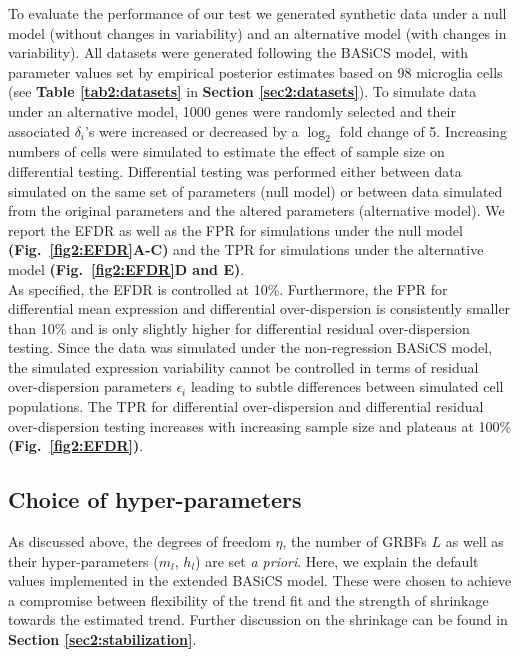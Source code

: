\newpage

To evaluate the performance of our test we generated synthetic data under a null model (without changes in variability) and an alternative model (with changes in variability). 
All datasets were generated following the BASiCS model, with parameter values set by empirical posterior estimates based on 98 microglia cells \citep{Zeisel2015} (see \textbf{Table \ref{tab2:datasets}} in \textbf{Section \ref{sec2:datasets}}). 
To simulate data under an alternative model, 1000 genes were randomly selected and their associated $\delta_i$'s were increased or decreased by a $\log_2$ fold change of 5. 
Increasing numbers of cells were simulated to estimate the effect of sample size on differential testing. 
Differential testing was performed either between data simulated on the same set of parameters (null model) or between data simulated from the original parameters and the altered parameters (alternative model). 
We report the EFDR \citep{Newton2004} as well as the \gls{FPR} for simulations under the null model \textbf{(Fig.~\ref{fig2:EFDR}A-C)} and the \gls{TPR} for simulations under the alternative model \textbf{(Fig.~\ref{fig2:EFDR}D and E)}. \\

As specified, the EFDR is controlled at 10\%. 
Furthermore, the FPR for differential mean expression and differential over-dispersion is consistently smaller than 10\% and is only slightly higher for differential residual over-dispersion testing. 
Since the data was simulated under the non-regression BASiCS model, the simulated expression variability cannot be controlled in terms of residual over-dispersion parameters $\epsilon_i$ leading to subtle differences between simulated cell populations. 
The TPR for differential over-dispersion and differential residual over-dispersion testing increases with increasing sample size and plateaus at 100\% \textbf{(Fig.~\ref{fig2:EFDR})}.

\subsection{Choice of hyper-parameters} \label{sec2:hyper-parameters}

As discussed above, the degrees of freedom $\eta$, the number of GRBFs  $L$ as well as their hyper-parameters ($m_l$, $h_l$) are set \emph{a priori}. 
Here, we explain the default values implemented in the extended BASiCS model. 
These were chosen to achieve a compromise between flexibility of the trend fit and the strength of shrinkage towards the estimated trend. 
Further discussion on the shrinkage can be found in \textbf{Section \ref{sec2:stabilization}}. \\ 

